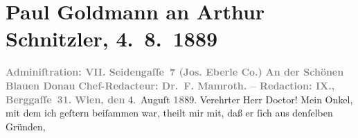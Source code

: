 

         
         \newcommand{\erwaehntePersonen}{Personen: Fedor Mamroth, Julius Schnitzler}
         \newcommand{\erwaehnteInstitutionen}{Institutionen: An der schönen blauen Donau, Josef Eberle  Stein-, Buch und Musikaliendruckerei}
         \newcommand{\erwaehnteOrte}{Orte: Bad Ischl, Berggasse, Reichenau, Seidengasse, Traunkirchen, Wien}
         \newcommand{\erwaehnteWerke}{Werke: Der Sohn. Aus den Papieren eines Arztes}
               \section[Paul Goldmann an Arthur Schnitzler, 4. 8. 1889]{ Paul Goldmann an Arthur Schnitzler, 4. 8. 1889}\nopagebreak{}\rehead{ }\begin{ledgroupsized}[t]{13cm}\normalsize\beginnumbering \toendnotes[C]{\smallbreak\pagebreak[2]} 
\toendnotes[C]{\smallbreak}\pstart
           \noindent{}\centering{}{\pb}\textcolor{gray}{\textbf{\textbf{Adminiſtration: VII.
                           Seidengaſſe 7} (Jos. Eberle {\kaufmannsund} Co.)}}\pend
           \pstart
           \noindent{}\centering{}\textcolor{gray}{\textbf{An der Schönen Blauen Donau}}\pend
           \pstart
           \noindent{}\centering{}\textcolor{gray}{\textbf{Chef-Redacteur: Dr. F.
                        Mamroth. – Redaction: IX.,
                        Berggaſſe 31.}}\pend
           \pstart
           \raggedleft{}\textcolor{gray}{\textbf{Wien, den}}{ }4. Auguſt \textcolor{gray}{\textbf{18}}89.\pend
           \pstart{}Verehrter Herr Doctor!\pend\pstart
           Mein Onkel, mit dem ich geſtern beiſammen war, theilt mir mit, daß er ſich aus denſelben Gründen,

\end{ledgroupsized}
